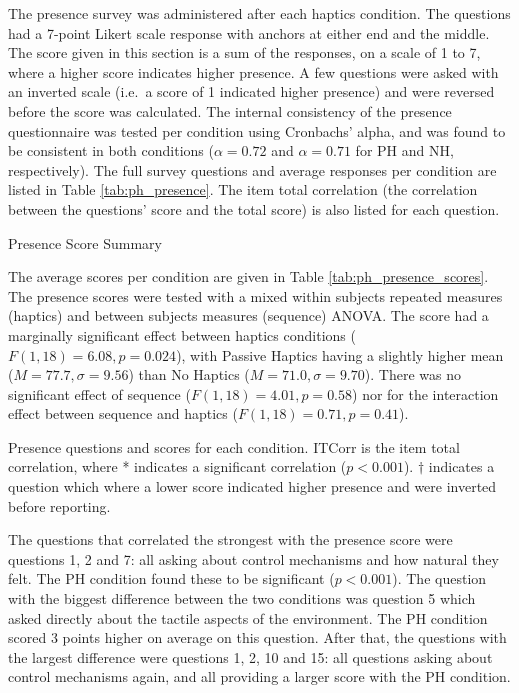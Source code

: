 The presence survey was administered after each haptics condition.
The questions had a 7-point Likert scale response with anchors at either end and the middle.
The score given in this section is a sum of the responses, on a scale of 1 to 7, where a higher score indicates higher presence.
A few questions were asked with an inverted scale (i.e.\ a score of 1 indicated higher presence) and were reversed before the score was calculated.
The internal consistency of the presence questionnaire was tested per condition using Cronbachs' alpha, and was found to be consistent in both conditions ($\alpha=0.72$ and $\alpha=0.71$ for PH and NH, respectively).
The full survey questions and average responses per condition are listed in Table \ref{tab:ph_presence}.
The item total correlation (the correlation between the questions' score and the total score) is also listed for each question.

\begin{table}
    \centering
    \small
    \caption{Presence Score Summary}
    \label{tab:ph_presence_scores}
\end{table}

The average scores per condition are given in Table \ref{tab:ph_presence_scores}.
The presence scores were tested with a mixed within subjects repeated measures (haptics) and between subjects measures (sequence) ANOVA.
The score had a marginally significant effect between haptics conditions ($F(1,18)=6.08, p=0.024$), with Passive Haptics having a slightly higher mean ($M=77.7, \sigma=9.56$) than No Haptics ($M=71.0, \sigma=9.70$).
There was no significant effect of sequence ($F(1,18)=4.01, p=0.58$) nor for the interaction effect between sequence and haptics ($F(1,18)=0.71, p=0.41$).

\begin{sidewaystable}
    \centering
    \caption{Presence questions and scores for each condition. ITCorr is the item total correlation, where * indicates a significant correlation ($p<0.001$). $\dagger$ indicates a question which where a lower score indicated higher presence and were inverted before reporting.}
    \label{tab:ph_presence}
\end{sidewaystable}

The questions that correlated the strongest with the presence score were questions 1, 2 and 7: all asking about control mechanisms and how natural they felt.
The PH condition found these to be significant ($p<0.001$).
The question with the biggest difference between the two conditions was question 5 which asked directly about the tactile aspects of the environment.
The PH condition scored 3 points higher on average on this question.
After that, the questions with the largest difference were questions 1, 2, 10 and 15: all questions asking about control mechanisms again, and all providing a larger score with the PH condition.

